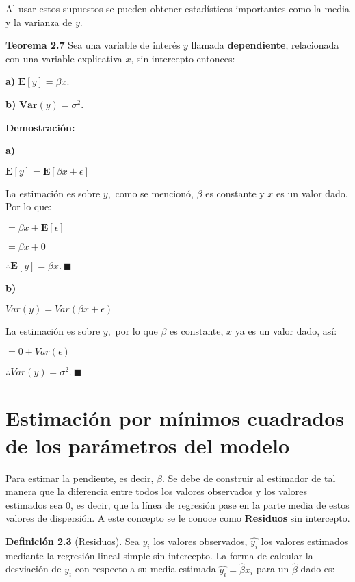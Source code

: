\documentclass[
  a4paper,
  oneside,
  openany]{book}
\begin{document}
Al usar estos supuestos se pueden obtener estadísticos importantes como la
media y la varianza de \(y\).

\textbf{Teorema 2.7} Sea una variable de interés \(y\) llamada \textbf{dependiente}, relacionada con una variable explicativa \(x\), sin intercepto entonces:

\textbf{a)} \(\mathbf{E}[y]=\beta x.\)

\textbf{b)} \(\textbf{Var}(y)=\sigma^2.\)

\textbf{Demostración:}

\textbf{a)}

\(\mathbf{E}[y]=\mathbf{E}[\beta x + \epsilon]\)

La estimación es sobre \(y,\) como se mencionó, \(\beta\) es constante y \(x\) es un valor dado. Por lo que:

\(=\beta x + \mathbf{E}[\epsilon]\)

\(=\beta x + 0\)

\(\therefore \mathbf{E}[y]= \beta x. \ \blacksquare\)

\textbf{b)}

\(Var(y)=Var(\beta x + \epsilon)\)

La estimación es sobre \(y,\) por lo que \(\beta\) es constante, \(x\) ya es un valor dado, así:

\(=0+Var(\epsilon)\)

\(\therefore Var(y)=\sigma^2.\ \blacksquare\)

\hypertarget{estimaciuxf3n-por-muxednimos-cuadrados-de-los-paruxe1metros-del-modelo-1}{%
\section{Estimación por mínimos cuadrados de los parámetros del modelo}\label{estimaciuxf3n-por-muxednimos-cuadrados-de-los-paruxe1metros-del-modelo-1}}

Para estimar la pendiente, es decir, \(\beta.\) Se debe de construir al estimador de tal manera que la diferencia entre todos los valores observados y los valores estimados sea 0, es decir, que la línea de regresión pase en la parte media de estos valores de dispersión. A este concepto se le conoce como \textbf{Residuos} sin intercepto.

\textbf{Definición 2.3} (Residuos). Sea \(y_{i}\) los valores observados, \(\hat{y_{i}}\) los valores estimados mediante la regresión lineal simple sin intercepto. La forma de calcular la desviación de \(y_{i}\) con respecto a su media estimada \(\hat{y_{i}}=\hat{\beta}x_{i}\) para un \(\hat{\beta}\) dado es:
\end{document}
